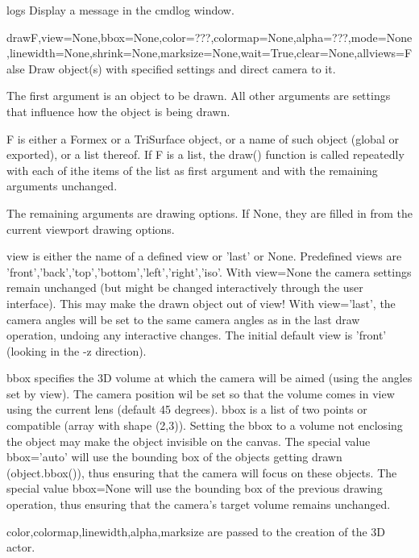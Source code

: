 \begin{funcdesc}{log}{s}
Display a message in the cmdlog window.

\end{funcdesc}


\begin{funcdesc}{draw}{F,view=None,bbox=None,color=???,colormap=None,alpha=???,mode=None,linewidth=None,shrink=None,marksize=None,wait=True,clear=None,allviews=False}
Draw object(s) with specified settings and direct camera to it.

    The first argument is an object to be drawn. All other arguments are
    settings that influence how  the object is being drawn.

    F is either a Formex or a TriSurface object, or a name of such object
    (global or exported), or a list thereof.
    If F is a list, the draw() function is called repeatedly with each of
    ithe items of the list as first argument and with the remaining arguments
    unchanged.

    The remaining arguments are drawing options. If None, they are filled in
    from the current viewport drawing options.
    
    view is either the name of a defined view or 'last' or None.
    Predefined views are 'front','back','top','bottom','left','right','iso'.
    With view=None the camera settings remain unchanged (but might be changed
    interactively through the user interface). This may make the drawn object
    out of view!
    With view='last', the camera angles will be set to the same camera angles
    as in the last draw operation, undoing any interactive changes.
    The initial default view is 'front' (looking in the -z direction).

    bbox specifies the 3D volume at which the camera will be aimed (using the
    angles set by view). The camera position wil be set so that the volume
    comes in view using the current lens (default 45 degrees).
    bbox is a list of two points or compatible (array with shape (2,3)).
    Setting the bbox to a volume not enclosing the object may make the object
    invisible on the canvas.
    The special value bbox='auto' will use the bounding box of the objects
    getting drawn (object.bbox()), thus ensuring that the camera will focus
    on these objects.
    The special value bbox=None will use the bounding box of the previous
    drawing operation, thus ensuring that the camera's target volume remains
    unchanged.

    color,colormap,linewidth,alpha,marksize are passed to the
    creation of the 3D actor.


\end{funcdesc}
